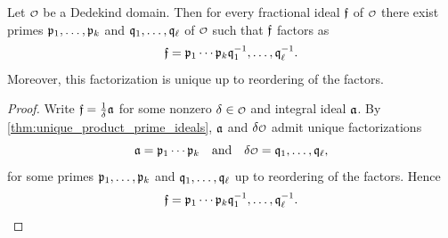     \begin{corollary}\label{cor:fractional_ideal_prime_factorization}
      Let \(\smc{O}\) be a Dedekind domain. Then for every fractional ideal \(\mathfrak{f}\) of \(\smc{O}\) there exist primes \(\mathfrak{p}_{1},\ldots,\mathfrak{p}_{k}\) and \(\mathfrak{q}_{1},\ldots,\mathfrak{q}_{\ell}\) of \(\smc{O}\) such that \(\mathfrak{f}\) factors as
      \[
        \mathfrak{f} = \mathfrak{p}_{1} \cdots \mathfrak{p}_{k}\mathfrak{q}_{1}^{-1},\ldots,\mathfrak{q}_{\ell}^{-1}.
      \]
      Moreover, this factorization is unique up to reordering of the factors.
    \end{corollary}
    \begin{proof}
      Write \(\mathfrak{f} = \frac{1}{\delta}\mathfrak{a}\) for some nonzero \(\d \in \smc{O}\) and integral ideal \(\mathfrak{a}\). By \cref{thm:unique_product_prime_ideals}, \(\mathfrak{a}\) and \(\d\smc{O}\) admit unique factorizations
      \[
        \mf{a} = \mf{p}_{1} \cdots \mf{p}_{k} \quad \text{and} \quad \d\smc{O} = \mf{q}_{1},\ldots,\mf{q}_{\ell},
      \]
      for some primes \(\mathfrak{p}_{1},\ldots,\mathfrak{p}_{k}\) and \(\mathfrak{q}_{1},\ldots,\mathfrak{q}_{\ell}\) up to reordering of the factors. Hence
      \[
        \mathfrak{f} = \mathfrak{p}_{1} \cdots \mathfrak{p}_{k}\mathfrak{q}_{1}^{-1},\ldots,\mathfrak{q}_{\ell}^{-1}.
      \]
    \end{proof}

